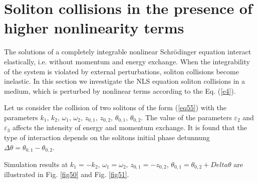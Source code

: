 \documentclass[preprint,12pt]{elsarticle}
\begin{document}
\section{Soliton collisions in the presence of higher nonlinearity terms}\label{ch10}
The solutions of a completely integrable nonlinear Schr\"{o}dinger equation interact elastically, i.e. without momentum and energy exchange. When the integrability of the system is violated by external perturbations, soliton collisions become inelastic. In this section we investigate the NLS equation soliton collisions in a medium, which is perturbed by nonlinear terms according to the Eq. (\ref{e4}).

Let us consider the collision of two solitons of the form (\ref{eq55}) with the parameters \(k_{1},\,k_{2},\,\omega_{1},\,\omega_{2},\,z_{0,1},\,z_{0,2},\,\theta_{0,1},\,\theta_{0,2}\). The value of the parameters \(\varepsilon_{2}\) and \(\varepsilon_{3}\) affects the intensity of energy and momentum exchange. It is found that the type of interaction depends on the solitons initial phase detunnung \(\Delta \theta=\theta_{0,1}-\theta_{0,2}\).

Simulation results at \(k_{1}=-k_{2},\,\omega_{1}=\omega_{2},\,z_{0,1}=-z_{0,2},\,\theta_{0,1}=\theta_{0,2}+Delta \theta\) are illustrated in Fig. \ref{fig50} and Fig. \ref{fig51}.
\end{document}
